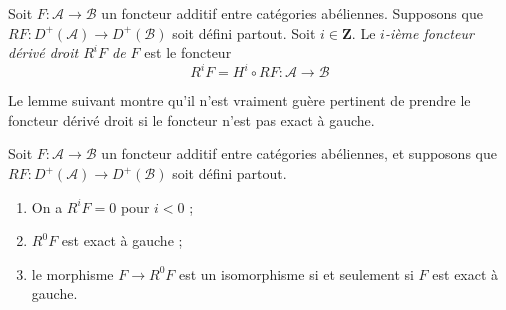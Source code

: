 \begin{definition}
\label{definition-higher-derived-functors}
Soit $F : \mathcal{A} \to \mathcal{B}$ un foncteur additif entre catégories
abéliennes. Supposons que
$RF : D^{+}(\mathcal{A}) \to D^{+}(\mathcal{B})$ soit défini partout. Soit
$i \in \mathbf{Z}$. Le {\it $i$-ième foncteur dérivé droit $R^iF$ de $F$} est
le foncteur
$$
R^iF = H^i \circ RF :
\mathcal{A}
\longrightarrow
\mathcal{B}
$$
\end{definition}

\noindent
Le lemme suivant montre qu'il n'est vraiment guère pertinent de prendre le
foncteur dérivé droit si le foncteur n'est pas exact à gauche.

\begin{lemma}
\label{lemma-left-exact-higher-derived}
Soit $F : \mathcal{A} \to \mathcal{B}$ un foncteur additif entre catégories
abéliennes, et supposons que
$RF : D^{+}(\mathcal{A}) \to D^{+}(\mathcal{B})$ soit défini partout.
\begin{enumerate}
\item On a $R^iF = 0$ pour $i < 0$ ;
\item $R^0F$ est exact à gauche ;
\item le morphisme $F \to R^0F$ est un isomorphisme si et seulement si $F$ est
exact à gauche.
\end{enumerate}
\end{lemma}

